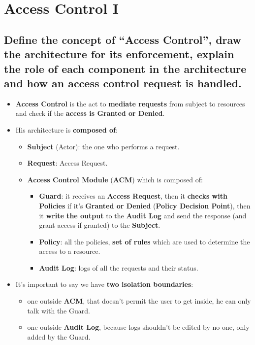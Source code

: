 \documentclass[9pt, letterpaper]{article}
\begin{document}
\newpage

\section{Access Control I}

\subsection{Define the concept of “Access Control”, draw the architecture for its enforcement, explain the role of each component in the architecture and how an access control request is handled.}
\begin{itemize}
	\item \textbf{Access Control} is the act to \textbf{mediate requests} from subject to resources and check if the \textbf{access is Granted or Denied}.
	\item His architecture is \textbf{composed of}:
	      \begin{itemize}
		      \item \textbf{Subject} (Actor): the one who performs a request.
		      \item \textbf{Request}: Access Request.
		      \item \textbf{Access Control Module} (\textbf{ACM}) which is composed of:
		            \begin{itemize}
			            \item \textbf{Guard}: it receives an \textbf{Access Request}, then it \textbf{checks with Policies} if it's \textbf{Granted or Denied} (\textbf{Policy Decision Point}), then it \textbf{write the output} to the \textbf{Audit Log} and send the response (and grant access if granted) to the \textbf{Subject}.
			            \item \textbf{Policy}: all the policies, \textbf{set of rules} which are used to determine the access to a resource.
			            \item \textbf{Audit Log}: logs of all the requests and their status.
		            \end{itemize}
	      \end{itemize}
	\item It's important to say we have \textbf{two isolation boundaries}:
	      \begin{itemize}
		      \item one outside \textbf{ACM}, that doesn't permit the user to get inside, he can only talk with the Guard.
		      \item one outside \textbf{Audit Log}, because logs shouldn't be edited by no one, only added by the Guard.

\end{itemize}
\end{itemize}
\end{document}
